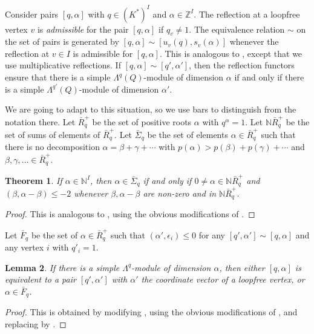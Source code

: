 \documentclass[12pt,a4paper]{amsart}
\theoremstyle{plain}
\newtheorem{thm}{Theorem}[section]
\newtheorem{lem}[thm]{Lemma}
\newcommand{\Z}{\mathbb Z}
\newcommand{\N}{\mathbb N}
\begin{document}
Consider pairs $[q,\alpha]$ with $q\in (K^*)^I$ and $\alpha\in\Z^I$.
The reflection at a loopfree vertex $v$ is \emph{admissible} for the pair $[q,\alpha]$ if $q_v\neq 1$. 
The equivalence relation $\sim$ on the set of pairs is generated by 
$[q,\alpha]\sim[u_v(q),s_v(\alpha)]$ whenever the reflection at $v\in I$ is admissible for $[q,\alpha]$.
This is analogous to \cite[\S2]{CBmm}, except that we use multiplicative reflections.
If $[q,\alpha]\sim[q',\alpha']$, then the reflection functors ensure that there is a simple $\Lambda^{q}(Q)$-module of dimension $\alpha$ if and only if there is a simple $\Lambda^{q'}(Q)$-module of dimension $\alpha'$.

We are going to adapt \cite[\S\S5,7,8]{CBmm} to this situation, so we use bars to distinguish from the notation there.
Let $\bar R^+_q$ be the set of positive roots $\alpha$ with $q^\alpha=1$.
Let $\N \bar R^+_q$ be the set of sums of elements of $\bar R^+_q$.
Let $\bar\Sigma_q$ be the set of elements $\alpha\in \bar R^+_q$
such that there is no decomposition $\alpha = \beta+\gamma+\cdots$ with 
$p(\alpha)>p(\beta)+p(\gamma)+\cdots$ and $\beta,\gamma,\ldots\in \bar R^+_q$.


\begin{thm}
If $\alpha\in\N^I$, then $\alpha\in\bar\Sigma_q$ if and only if $0\neq \alpha\in \N \bar R^+_q$
and $(\beta,\alpha-\beta)\le -2$ whenever $\beta,\alpha-\beta$ are non-zero and in $\N \bar R^+_q$.
\end{thm}


\begin{proof}
This is analogous to \cite[Theorem 5.6]{CBmm}, using the obvious modifications of \cite[Lemmas 5.1--5.5]{CBmm}.
\end{proof}


Let $\bar F_q$ be the set of $\alpha\in \bar R^+_q$ such that $(\alpha',\epsilon_i)\le 0$ for any $[q',\alpha']\sim [q,\alpha]$ and any vertex $i$ with $q'_i=1$.


\begin{lem}
\label{l:simplecoodorfq}
If there is a simple $\Lambda^q$-module of dimension $\alpha$, then either $[q,\alpha]$
is equivalent to a pair $[q',\alpha']$ with $\alpha'$ the coordinate vector of a loopfree vertex, or $\alpha\in \bar F_q$.
\end{lem}


\begin{proof}
This is obtained by modifying \cite[Lemma 7.4]{CBmm}, using the obvious modifications of \cite[Lemma 7.1, 7.3]{CBmm}, and replacing \cite[Lemma 7.2]{CBmm} by \cite[Lemma 5.1]{CBSh}.
\end{proof}
\end{document}
